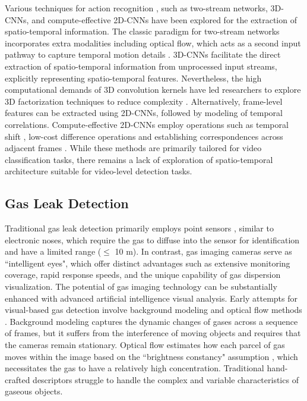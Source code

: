 Various techniques for action recognition \cite{chen2021deep}, such as two-stream networks, 3D-CNNs, and compute-effective 2D-CNNs have been explored for the extraction of spatio-temporal information. The classic paradigm for two-stream networks incorporates extra modalities including optical flow, which acts as a second input pathway to capture temporal motion details \cite{cheron2015p,wang2016temporal}. 3D-CNNs facilitate the direct extraction of spatio-temporal information from unprocessed input streams, explicitly representing spatio-temporal features\cite{tran2015learning,carreira2017quo,hara2018can}. Nevertheless, the high computational demands of 3D convolution kernels have led researchers to explore 3D factorization techniques to reduce complexity \cite{qiu2017learning, tran2018closer}. Alternatively, frame-level features can be extracted using 2D-CNNs, followed by modeling of temporal correlations. Compute-effective 2D-CNNs employ operations such as temporal shift \cite{fan2019more,shao2020temporal,lin2019tsm}, low-cost difference operations \cite{wang2021tdn} and establishing correspondences across adjacent frames \cite{kwon2020motionsqueeze}. While these methods are primarily tailored for video classification tasks, there remains a lack of exploration of spatio-temporal architecture suitable for video-level detection tasks.

\subsection{Gas Leak Detection}
Traditional gas leak detection primarily employs point sensors \cite{murvay2012survey}, similar to electronic noses, which require the gas to diffuse into the sensor for identification and have a limited range ($\leq$ 10 m). In contrast,  gas imaging cameras \cite{hagen2020survey,gaalfalk2016making} serve as ``intelligent eyes", which offer distinct advantages such as extensive monitoring coverage, rapid response speeds, and the unique capability of gas dispersion visualization. The potential of gas imaging technology can be substantially enhanced  with advanced artificial intelligence visual analysis. Early attempts for visual-based gas detection involve background modeling \cite{zeng2018gas,wang2018infrared,hong2019vocs} and optical flow methods \cite{hagen2020survey}. Background modeling  captures the dynamic changes of gases across a sequence of frames, but it suffers from the interference of moving objects and requires that the cameras remain stationary. Optical flow estimates how each parcel of gas moves within the image based on the ``brightness constancy" assumption \cite{fleet2006optical}, which necessitates the gas to have a relatively high concentration. Traditional hand-crafted descriptors struggle to handle the complex and variable characteristics of gaseous objects.

